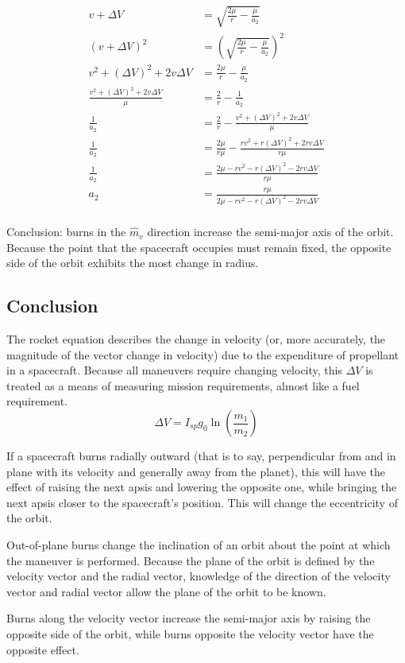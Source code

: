 \documentclass[../basicOrbitalDynamics.tex]{subfiles}
\begin{document}
\begin{align*}
    v + \Delta V                            & = \sqrt{\frac{2\mu}{r}-\frac{\mu}{a_2}}                        \\
    (v + \Delta V)^2                        & = \left(\sqrt{\frac{2\mu}{r}-\frac{\mu}{a_2}}\right)^2         \\
    v^2 + (\Delta V)^2 + 2v\Delta V         & = \frac{2\mu}{r}-\frac{\mu}{a_2}                               \\
    \frac{v^2+(\Delta V)^2+2v\Delta V}{\mu} & =\frac{2}{r}-\frac{1}{a_2}                                     \\
    \frac{1}{a_2}                           & =\frac{2}{r}-\frac{v^2+(\Delta V)^2+2v\Delta V}{\mu}           \\
    \frac{1}{a_2}                           & =\frac{2\mu}{r\mu}-\frac{rv^2+r(\Delta V)^2+2rv\Delta V}{r\mu} \\
    \frac{1}{a_2}                           & =\frac{2\mu-rv^2-r(\Delta V)^2-2rv\Delta V}{r\mu}              \\
    {a_2}                                   & =\frac{r\mu}{2\mu-rv^2-r(\Delta V)^2-2rv\Delta V}              \\
\end{align*}

Conclusion: burns in the $\hat{m}_v$ direction increase the semi-major axis of the orbit. Because the point that the spacecraft occupies must remain fixed, the opposite side of the orbit exhibits the most change in radius.

\bigskip\bigskip
\subsection{Conclusion}

\bigskip
The rocket equation describes the change in velocity (or, more accurately, the magnitude of the vector change in velocity) due to the expenditure of propellant in a spacecraft. Because all maneuvers require changing velocity, this $\Delta V$ is treated as a means of measuring mission requirements, almost like a fuel requirement.
\[\Delta V = I_{sp}g_0\ln\left(\frac{m_1}{m_2}\right)\]

\bigskip
If a spacecraft burns radially outward (that is to say, perpendicular from and in plane with its velocity and generally away from the planet), this will have the effect of raising the next apsis and lowering the opposite one, while bringing the next apsis closer to the spacecraft's position. This will change the eccentricity of the orbit.

Out-of-plane burns change the inclination of an orbit about the point at which the maneuver is performed. Because the plane of the orbit is defined by the velocity vector and the radial vector, knowledge of the direction of the velocity vector and radial vector allow the plane of the orbit to be known.

Burns along the velocity vector increase the semi-major axis by raising the opposite side of the orbit, while burns opposite the velocity vector have the opposite effect.
\end{document}

